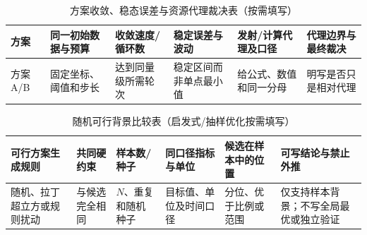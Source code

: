 \documentclass[withoutpreface,bwprint]{cumcmthesis}
\begin{document}
  \begin{table}[H]
    \centering
    \small
    \caption{方案收敛、稳态误差与资源代理裁决表（按需填写）}
    \label{tab:convergence-resource-decision-guide}
    \begin{tabular}{p{1.45cm}p{2.2cm}p{2.1cm}p{2.15cm}p{2.55cm}p{2.5cm}}
      \toprule
      方案 & 同一初始数据与预算 & 收敛速度/循环数 & 稳定误差与波动 & 发射/计算代理及口径 & 代理边界与最终裁决 \\
      \midrule
      方案 A/B & 固定坐标、阈值和步长 & 达到同量级所需轮次 & 稳定区间而非单点最小值 & 给公式、数值和同一分母 & 明写是否只是相对代理 \\
      \bottomrule
    \end{tabular}
  \end{table}
  \begin{table}[H]
    \centering
    \small
    \setlength{\tabcolsep}{3.4pt}
    \caption{随机可行背景比较表（启发式/抽样优化按需填写）}
    \label{tab:feasible-background-guide}
    \begin{tabular}{p{2.05cm}p{2.1cm}p{1.7cm}p{2.2cm}p{2.2cm}p{2.7cm}}
      \toprule
      可行方案生成规则 & 共同硬约束 & 样本数/种子 & 同口径指标与单位 & 候选在样本中的位置 & 可写结论与禁止外推 \\
      \midrule
      随机、拉丁超立方或规则扰动 & 与候选完全相同 & $N$、重复和随机种子 & 目标值、单位及时间口径 & 分位、优于比例或范围 & 仅支持样本背景；不写全局最优或独立验证 \\
      \bottomrule
    \end{tabular}
  \end{table}
\fi
\end{document}
